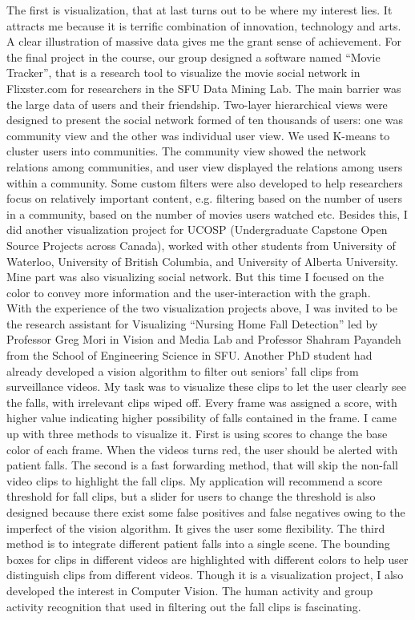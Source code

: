 \documentclass{article}
\begin{document}
The first is visualization, that at last turns out to be where my interest lies. It attracts me because it is terrific combination of innovation, technology and arts. A clear illustration of massive data gives me the grant sense of achievement. For the final project in the course, our group designed a software named ``Movie Tracker'', that is a research tool to visualize the movie social network in Flixster.com for researchers in the SFU Data Mining Lab. The main barrier was the large data of users and their friendship. Two-layer hierarchical views were designed to present the social network formed of ten thousands of users: one was community view and the other was individual user view. We used K-means to cluster users into communities. The community view showed the network relations among communities, and user view displayed the relations among users within a community. Some custom filters were also developed to help researchers focus on relatively important content, e.g. filtering based on the number of users in a community, based on the number of movies users watched etc. Besides this, I did another visualization project for UCOSP (Undergraduate Capstone Open Source Projects across Canada), worked with other students from University of Waterloo, University of British Columbia, and University of Alberta University. Mine part was also visualizing social network. But this time I focused on the color to convey more information and the user-interaction with the graph. \\


With the experience of the two visualization projects above, I was invited to be the research assistant for Visualizing ``Nursing Home Fall Detection'' led by Professor Greg Mori in Vision and Media Lab and Professor Shahram Payandeh from the School of Engineering Science in SFU. Another PhD student had already developed a vision algorithm to filter out seniors' fall clips from surveillance videos. My task was to visualize these clips to let the user clearly see the falls, with irrelevant clips wiped off. Every frame was assigned a score, with higher value indicating higher possibility of falls contained in the frame. I came up with three methods to visualize it. First is using scores to change the base color of each frame. When the videos turns red, the user should be alerted with patient falls. The second is a fast forwarding method, that will skip the non-fall video clips to highlight the fall clips. My application will recommend a score threshold for fall clips, but a slider for users to change the threshold is also designed because there exist some false positives and false negatives owing to the imperfect of the vision algorithm. It gives the user some flexibility. The third method is to integrate different patient falls into a single scene. The bounding boxes for clips in different videos are highlighted with different colors to help user distinguish clips from different videos. Though it is a visualization project, I also developed the interest in Computer Vision. The human activity and group activity recognition that used in filtering out the fall clips is fascinating.  \\
\end{document}
